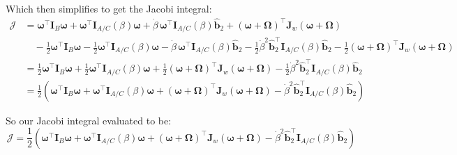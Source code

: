 \documentclass[titlepage]{article}
\begin{document}
Which then simplifies to get the Jacobi integral:
\begin{equation}
	\begin{split}
		\mathcal{J}&=\boldsymbol{\omega}^\top\boldsymbol{I}_B\boldsymbol{\omega}+\boldsymbol{\omega}^\top\boldsymbol{I}_{A/C}(\beta)\boldsymbol{\omega}+\dot{\beta}\,\boldsymbol{\omega}^\top\boldsymbol{I}_{A/C}(\beta)\hat{\boldsymbol{b}}_2+\left(\boldsymbol{\omega}+\boldsymbol{\Omega}\right)^\top\boldsymbol{J}_w\left(\boldsymbol{\omega}+\boldsymbol{\Omega}\right) \\
		&\quad-\frac{1}{2}\boldsymbol{\omega}^\top\boldsymbol{I}_B\boldsymbol{\omega}-\frac{1}{2}\boldsymbol{\omega}^\top\boldsymbol{I}_{A/C}(\beta)\boldsymbol{\omega}-\dot{\beta}\,\boldsymbol{\omega}^\top\boldsymbol{I}_{A/C}(\beta)\hat{\boldsymbol{b}}_2-\frac{1}{2}\dot{\beta}^2\hat{\boldsymbol{b}}_2^\top\boldsymbol{I}_{A/C}(\beta)\hat{\boldsymbol{b}}_2-\frac{1}{2}\left(\boldsymbol{\omega}+\boldsymbol{\Omega}\right)^\top\boldsymbol{J}_w\left(\boldsymbol{\omega}+\boldsymbol{\Omega}\right) \\
		&=\frac{1}{2}\boldsymbol{\omega}^\top\boldsymbol{I}_B\boldsymbol{\omega}+\frac{1}{2}\boldsymbol{\omega}^\top\boldsymbol{I}_{A/C}(\beta)\boldsymbol{\omega}+\frac{1}{2}\left(\boldsymbol{\omega}+\boldsymbol{\Omega}\right)^\top\boldsymbol{J}_w\left(\boldsymbol{\omega}+\boldsymbol{\Omega}\right)-\frac{1}{2}\dot{\beta}^2\hat{\boldsymbol{b}}_2^\top\boldsymbol{I}_{A/C}(\beta)\hat{\boldsymbol{b}}_2 \\
		&=\frac{1}{2}\left(\boldsymbol{\omega}^\top\boldsymbol{I}_B\boldsymbol{\omega}+\boldsymbol{\omega}^\top\boldsymbol{I}_{A/C}(\beta)\boldsymbol{\omega}+\left(\boldsymbol{\omega}+\boldsymbol{\Omega}\right)^\top\boldsymbol{J}_w\left(\boldsymbol{\omega}+\boldsymbol{\Omega}\right)-\dot{\beta}^2\hat{\boldsymbol{b}}_2^\top\boldsymbol{I}_{A/C}(\beta)\hat{\boldsymbol{b}}_2\right)
	\end{split}
	\label{eq:jacobiresult}
\end{equation}

\begin{mdframed}
	So our Jacobi integral evaluated to be:
	\begingroup\small
	\begin{equation}
		\mathcal{J}=\frac{1}{2}\left(\boldsymbol{\omega}^\top\boldsymbol{I}_B\boldsymbol{\omega}+\boldsymbol{\omega}^\top\boldsymbol{I}_{A/C}(\beta)\boldsymbol{\omega}+\left(\boldsymbol{\omega}+\boldsymbol{\Omega}\right)^\top\boldsymbol{J}_w\left(\boldsymbol{\omega}+\boldsymbol{\Omega}\right)-\dot{\beta}^2\hat{\boldsymbol{b}}_2^\top\boldsymbol{I}_{A/C}(\beta)\hat{\boldsymbol{b}}_2\right)
	\end{equation}
	\endgroup
\end{mdframed}
\end{document}
